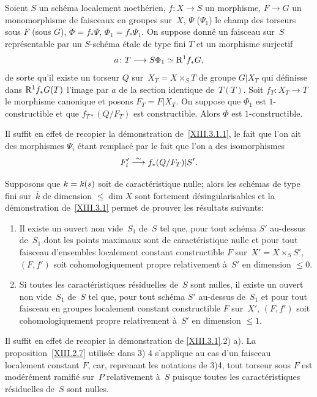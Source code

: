 \begin{sublemme}
\label{XIII.3.1.2}
Soient $S$ un sch\'ema localement noeth\'erien, $f\colon X\to S$
un morphisme, $F\to G$ un monomorphisme de faisceaux en groupes sur~$X$, $\Psi$ (\resp $\Psi_1$) le champ des torseurs sous $F$
(\resp sous $G$), $\Phi=f_*\Psi$, $\Phi_1=f_*\Psi_1$. On suppose
donn\'e un faisceau sur~$S$ repr\'esentable par un $S$-sch\'ema
\'etale de type fini $T$ et un morphisme surjectif
$$
a\colon T\to S\Phi_1\simeq\R^1f_*G,
$$
de sorte qu'il existe un torseur $Q$ sur~$X_T=X\times_ST$ de groupe
$G|X_T$ qui d\'efinisse dans $\mathrm{R}^1f_*G(T)$ l'image par $a$ de la
section identique de~$T(T)$. Soit $f_T\colon X_T\to T$ le morphisme
canonique et posons $F_T=F|X_T$. On suppose que $\Phi_1$ est
$1$-constructible et que $f_{T*}(Q/F_T)$ est constructible. Alors
$\Phi$ est $1$-constructible.
\end{sublemme}

Il suffit en effet de recopier la d\'emonstration
de~\ref{XIII.3.1.1}, le fait que l'on ait des morphismes $\Psi_i$
\'etant remplac\'e par le fait que l'on a des isomorphismes
$$
F'_i\overset{\sim}{\longrightarrow} f_*(Q/F_T)|S'.
$$

\begin{subremarque}
\label{XIII.3.1.3}
Supposons
que $k=\mathit{k}(s)$ soit de caract\'eristique nulle; alors les
sch\'emas de type fini sur~$\overline{k}$ de dimension $\leq\dim X$
sont fortement d\'esingularisables et la d\'emonstration
de~\ref{XIII.3.1} permet de prouver les r\'esultats suivants:
\begin{enumerate}
\item[a)] Il existe un ouvert non vide~$S_1$ de~$S$ tel que, pour tout
sch\'ema $S'$ au-dessus de~$S_1$ dont les points maximaux sont de
caract\'eristique nulle et pour tout faisceau d'ensembles localement
constant constructible $F$ sur~$X'=X\times_SS'$, $(F,f')$ soit
cohomologiquement propre relativement \`a~$S'$ en dimension $\leq
0$.

\item[b)] Si toutes les caract\'eristiques r\'esiduelles de~$S$ sont
nulles, il existe un ouvert non vide~$S_1$ de~$S$ tel que, pour tout
sch\'ema $S'$ au-dessus de~$S_1$ et pour tout faisceau en groupes
localement constant constructible $F$ sur~$X'$, $(F,f')$ soit
cohomologiquement propre relativement \`a~$S'$ en dimension $\leq1$.
\end{enumerate}

Il suffit en effet de recopier la d\'emonstration de
\ref{XIII.3.1}.2) a). La proposition~\ref{XIII.2.7} utilis\'ee dans
3) 4 s'applique au cas d'un faisceau localement constant $F$, car,
reprenant les notations de 3)4, tout torseur sous $F$ est
mod\'er\'ement ramifi\'e sur~$P$ relativement \`a~$S$ puisque
toutes les caract\'eristiques r\'esiduelles de~$S$ sont nulles.
\end{subremarque}

